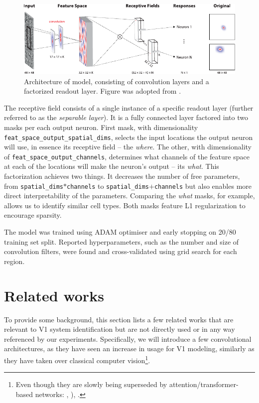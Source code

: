 \begin{figure}[h]
    \centering
    \includegraphics[width=1\textwidth]{../figures/02_fig2_A2u}
    \caption[klindt et al. model]{Architecture of \citeauthor{klindt} model, consisting of convolution layers and a factorized readout layer. Figure was adopted from \citep{klindt}.}
    \label{fig:2.2}
\end{figure}

The receptive field consists of a single instance of a specific readout layer (further referred to as the \textit{separable layer}). It is a fully connected layer factored into two masks per each output neuron. First mask, with dimensionality \texttt{feat\_space\_output\_spatial\_dims}, selects the input locations the output neuron will use, in essence its receptive field -- the \textit{where}. The other, with dimensionality of \texttt{feat\_space\_output\_channels}, determines what channels of the feature space at each of the locations will make the neuron’s output -- its \textit{what}. This factorization achieves two things. It decreases the number of free parameters, from \texttt{spatial\_dims}$*$\texttt{channels} to \texttt{spa\-tial\_dims}$+$\texttt{channels} but also enables more direct interpretability of the parameters. Comparing the \textit{what} masks, for example, allows us to identify similar cell types. Both masks feature L1 regularization to encourage sparsity.

The model was trained using ADAM optimiser and early stopping on 20/80 training set split. Reported hyperparameters, such as the number and size of convolution filters, were found and cross-validated using grid search for each region.

\section{Related works}\label{ch:2.3}
To provide some background, this section lists a few related works that are relevant to V1 system identification but are not directly used or in any way referenced by our experiments. Specifically, we will introduce a few convolutional architectures, as they have seen an increase in usage for V1 modeling, similarly as they have taken over classical computer vision\footnote{Even though they are slowly being superseded by attention/transformer-based networks: \citep{2019arXiv190605909R}, \citep{2019arXiv190409925B}), \citep{dosovitskiy2020image}.}.

